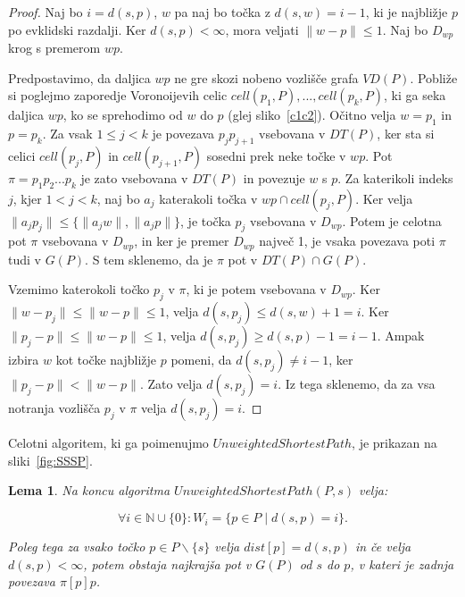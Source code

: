 \documentclass[a4paper, 12pt]{book}
\newcommand{\NN}{\ensuremath{\mathbb N}}  %
\newtheorem{lema}[izrek]{Lema}
\begin{document}
\begin{proof}
Naj bo $i = d(s,p)$, $w$ pa naj bo točka z $d(s,w) = i - 1$, ki je najbližje $p$ po evklidski razdalji. Ker $d(s,p) < \infty$, mora veljati $\|w - p\| \leq 1$. Naj bo $D_{wp}$ krog s premerom $wp$.

Predpostavimo, da daljica $wp$ ne gre skozi nobeno vozlišče grafa $VD(P)$. Pobliže si poglejmo zaporedje Voronoijevih celic $cell(p_1, P),..., cell(p_k, P)$, ki ga seka daljica $wp$, ko se sprehodimo od $w$ do $p$ (glej sliko~\ref{c1c2}). Očitno velja $w = p_1$ in $p = p_k$. Za vsak $1 \leq j < k$ je povezava $p_jp_{j+1}$ vsebovana v $DT(P)$, ker sta si celici $cell(p_j, P)$ in $cell(p_{j+1}, P)$ sosedni prek neke točke v $wp$. Pot $\pi = p_1p_2...p_k$ je zato vsebovana v $DT(P)$ in povezuje $w$ s $p$. Za katerikoli indeks $j$, kjer $1 < j < k$, naj bo $a_j$ katerakoli točka v $wp \cap cell(p_j, P)$. Ker velja $\|a_jp_j\| \leq \{\|a_jw\|, \|a_jp\|\}$, je točka $p_j$ vsebovana v $D_{wp}$. Potem je celotna pot $\pi$ vsebovana v $D_{wp}$, in ker je premer $D_{wp}$ največ 1, je vsaka povezava poti $\pi$ tudi v $G(P)$. S tem sklenemo, da je $\pi$ pot v $DT(P) \cap G(P)$.

Vzemimo katerokoli točko $p_j$ v $\pi$, ki je potem vsebovana v $D_{wp}$. Ker $\|w - p_j\| \leq \|w - p\| \leq 1$, velja $d(s, p_j) \leq d(s, w) + 1 = i$. Ker $\|p_j - p\| \leq \|w - p\| \leq 1$, velja $d(s, p_j) \geq d(s, p) - 1 = i - 1$. Ampak izbira $w$ kot točke najbližje $p$ pomeni, da $d(s, p_j) \neq i - 1$, ker $\|p_j - p\| < \|w - p\|$. Zato velja $d(s, p_j) = i$. Iz tega sklenemo, da za vsa notranja vozlišča $p_j$ v $\pi$ velja $d(s, p_j) = i$. 
\end{proof}

Celotni algoritem, ki ga poimenujmo $UnweightedShortestPath$, je prikazan na sliki~\ref{fig:SSSP}.

\begin{lema}
\label{lema2}
Na koncu algoritma $UnweightedShortestPath(P, s)$ velja:

\begin{equation}
\forall i \in \NN \cup \{0\}:  W_i = \{p\in P \mid d(s, p) = i\}.
\end{equation}

Poleg tega za vsako točko $p \in P \backslash \{s\}$ velja $dist[p] = d(s,p)$ in če velja $d(s,p) < \infty$, potem obstaja najkrajša pot v $G(P)$ od $s$ do $p$, v kateri je zadnja povezava $\pi [p]p$.
\end{lema}
\end{document}
